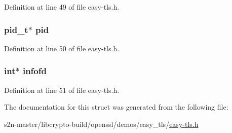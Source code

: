 Definition at line 49 of file easy-\/tls.\+h.

\subsubsection[{\texorpdfstring{pid}{pid}}]{\setlength{\rightskip}{0pt plus 5cm}pid\+\_\+t$\ast$ pid}\hypertarget{structtls__start__proxy__args_a5afce35563ade4cfbdd9e39f9138b41b}{}\label{structtls__start__proxy__args_a5afce35563ade4cfbdd9e39f9138b41b}


Definition at line 50 of file easy-\/tls.\+h.

\subsubsection[{\texorpdfstring{infofd}{infofd}}]{\setlength{\rightskip}{0pt plus 5cm}int$\ast$ infofd}\hypertarget{structtls__start__proxy__args_a66ef379c65277c233d179a1ac4129e32}{}\label{structtls__start__proxy__args_a66ef379c65277c233d179a1ac4129e32}


Definition at line 51 of file easy-\/tls.\+h.



The documentation for this struct was generated from the following file\+:\begin{DoxyCompactItemize}
\item 
s2n-\/master/libcrypto-\/build/openssl/demos/easy\+\_\+tls/\hyperlink{easy-tls_8h}{easy-\/tls.\+h}\end{DoxyCompactItemize}

